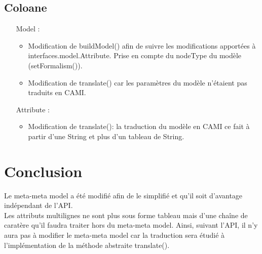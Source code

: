 \documentclass{article}
\begin{document}
\subsection{Coloane}
\begin{itemize}
	\item[Model]
		:
		\begin{itemize}
			\item Modification de buildModel() afin de suivre les modifications apport\'ees \`a interfaces.model.Attribute.
			Prise en compte du nodeType du mod\`ele (setFormalism()).
			\item Modification de translate() car les param\`etres du mod\`ele n'\'etaient pas traduits en CAMI.
		\end{itemize}

	\item[Attribute]
		:
		\begin{itemize}
			\item Modification de translate(): la traduction du mod\`ele en CAMI ce fait \`a partir d'une String et plus d'un tableau de String.
		\end{itemize}
\end{itemize}
	

\section{Conclusion}
Le meta-meta model a \'et\'e modifi\'e afin de le simplifi\'e et qu'il soit d'avantage ind\'ependant de l'API.\\

Les attributs multilignes ne sont plus sous forme tableau mais d'une cha\^ine de carat\`ere 
qu'il faudra traiter hors du meta-meta model.
Ainsi, suivant l'API, il n'y aura pas à modifier le meta-meta model car la traduction sera \'etudi\'e
à l'impl\'ementation de la m\'ethode abstraite translate().
\end{document}

